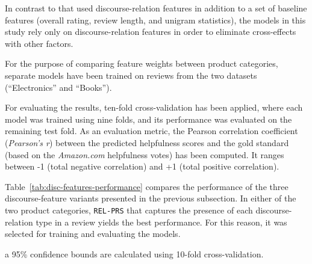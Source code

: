\documentclass[
    a4paper,%
    12pt,%
    oneside,%
    toc=bibliography,
    final,
]{scrartcl}
\begin{document}
In contrast to \citet{Golly2017} that used discourse-relation features in addition to a set of baseline features (overall rating, review length, and unigram statistics), the models in this study rely only on discourse-relation features in order to eliminate cross-effects with other factors.

For the purpose of comparing feature weights between product categories, separate models have been trained on reviews from the two datasets (“Electronics” and “Books”).

For evaluating the results, ten-fold cross-validation has been applied, where each model was trained using nine folds, and its performance was evaluated on the remaining test fold. As an evaluation metric, the Pearson correlation coefficient (\textit{Pearson's r}) between the predicted helpfulness scores and the gold standard (based on the \textit{Amazon.com} helpfulness votes) has been computed. It ranges between -1 (total negative correlation) and +1 (total positive correlation).

Table~\ref{tab:disc-features-performance} compares the performance of the three discourse-feature variants presented in the previous subsection. In either of the two product categories, \lstinline|REL-PRS| that captures the presence of each discourse-relation type in a review yields the best performance. For this reason, it was selected for training and evaluating the models.

\begin{table}[h!]
	\centering
	
	\caption{Evaluation results of a linear SVR model using different variants of discourse-relation features}
	\label{tab:disc-features-performance}
	
	\begin{threeparttable}
	\renewcommand{\arraystretch}{1.5}
	
	\begin{tablenotes}
	\centering
	\footnotesize
	\item[a] 95\% confidence bounds are calculated using 10-fold cross-validation.
	\end{tablenotes}
	
	\end{threeparttable}

\end{table}
\end{document}
